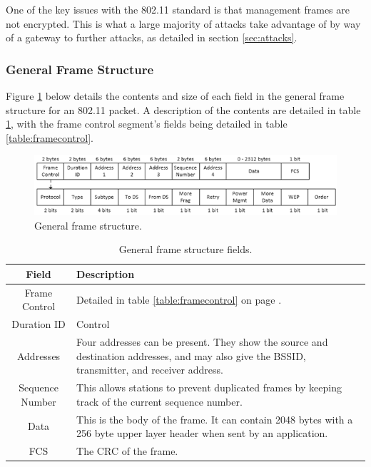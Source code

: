 One of the key issues with the 802.11 standard is that management frames are not encrypted. This is what a large majority of attacks take advantage of by way of a gateway to further attacks, as detailed in section \ref{sec:attacks}.

\clearpage
\subsubsection{General Frame Structure}
Figure \ref{fig:framestructure} below details the contents and size of each field in the general frame structure for an 802.11 packet. A description of the contents are detailed in table \ref{table:framefields}, with the frame control segment's fields being detailed in table \ref{table:framecontrol}.

\begin{figure}[h!]
\centering\includegraphics[width=\linewidth]{research/80211/figures/framestructure.png}
\caption{General frame structure.}
\label{fig:framestructure}
\end{figure}

	\begin{table}[!h]
\begin{center}
	\begin{tabular}{| c |  p{10cm} |}
		\hline
		\textbf{Field} & \textbf{Description} \\ \hline
		Frame Control & Detailed in table \ref{table:framecontrol} on page \pageref{table:framecontrol}.\\ \hline
		Duration ID & Control \\ \hline
		Addresses & Four addresses can be present.  They show the source and destination addresses, and may also give the BSSID, transmitter, and receiver address.  \\ \hline
		Sequence Number & This allows stations to prevent duplicated frames by keeping track of the current sequence number. \\ \hline
		Data & This is the body of the frame. It can contain 2048 bytes with a 256 byte upper layer header when sent by an application. \\ \hline
		FCS & The CRC \cite{research:crc_wiki} of the frame. \\ \hline
	\end{tabular}
	\caption{General frame structure fields.}
	\label{table:framefields}
\end{center}
	\end{table}

